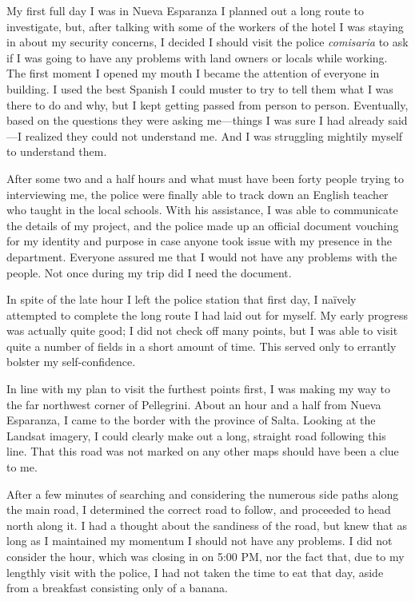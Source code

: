 My first full day I was in Nueva Esparanza I planned out a long route to investigate, but, after talking with some of the workers of the hotel I was staying in about my security concerns, I decided I should visit the police \textit{comisaria} to ask if I was going to have any problems with land owners or locals while working. The first moment I opened my mouth I became the attention of everyone in building. I used the best Spanish I could muster to try to tell them what I was there to do and why, but I kept getting passed from person to person. Eventually, based on the questions they were asking me—things I was sure I had already said—I realized they could not understand me. And I was struggling mightily myself to understand them.

After some two and a half hours and what must have been forty people trying to interviewing me, the police were finally able to track down an English teacher who taught in the local schools. With his assistance, I was able to communicate the details of my project, and the police made up an official document vouching for my identity and purpose in case anyone took issue with my presence in the department. Everyone assured me that I would not have any problems with the people. Not once during my trip did I need the document.

In spite of the late hour I left the police station that first day, I naïvely attempted to complete the long route I had laid out for myself. My early progress was actually quite good; I did not check off many points, but I was able to visit quite a number of fields in a short amount of time. This served only to errantly bolster my self-confidence.

In line with my plan to visit the furthest points first, I was making my way to the far northwest corner of Pellegrini. About an hour and a half from Nueva Esparanza, I came to the border with the province of Salta. Looking at the Landsat imagery, I could clearly make out a long, straight road following this line. That this road was not marked on any other maps should have been a clue to me.

After a few minutes of searching and considering the numerous side paths along the main road, I determined the correct road to follow, and proceeded to head north along it. I had a thought about the sandiness of the road, but knew that as long as I maintained my momentum I should not have any problems. I did not consider the hour, which was closing in on 5:00 PM, nor the fact that, due to my lengthly visit with the police, I had not taken the time to eat that day, aside from a breakfast consisting only of a banana.

